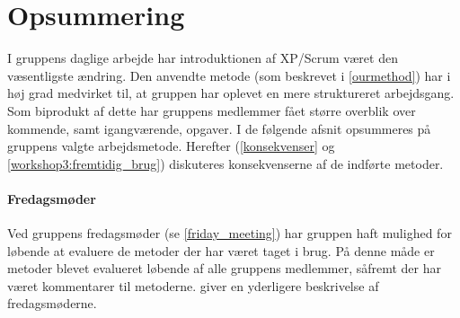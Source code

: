 \section{Opsummering}\label{workshop3:opsummering}
I gruppens daglige arbejde har introduktionen af XP/Scrum været den væsentligste ændring.
Den anvendte metode (som beskrevet i \cref{ourmethod}) har i høj grad medvirket til, at gruppen har oplevet en mere struktureret arbejdsgang.
Som biprodukt af dette har gruppens medlemmer fået større overblik over kommende, samt igangværende, opgaver.
I de følgende afsnit opsummeres på gruppens valgte arbejdsmetode.
Herefter (\cref{konsekvenser} og \cref{workshop3:fremtidig_brug}) diskuteres konsekvenserne af de indførte metoder.

\paragraph{Fredagsmøder}
Ved gruppens fredagsmøder (se \cref{friday_meeting}) har gruppen haft mulighed for løbende at evaluere de metoder der har været taget i brug.
På denne måde er metoder blevet evalueret løbende af alle gruppens medlemmer, såfremt der har været kommentarer til metoderne.
 giver en yderligere beskrivelse af fredagsmøderne.

\label{workshop3:fredag}
%
%
